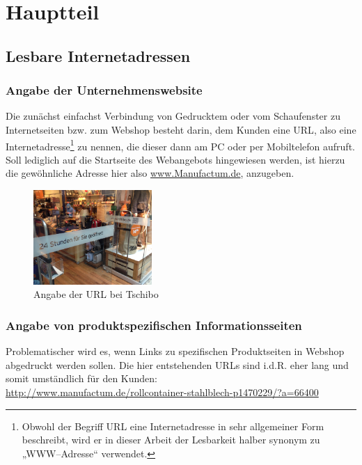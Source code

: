 \section{Hauptteil}
\label{sec:hauptteil}

\subsection{Lesbare Internetadressen}

\subsubsection{Angabe der Unternehmenswebsite}

Die zunächst einfachst Verbindung von Gedrucktem oder vom Schaufenster zu Internetseiten bzw. zum Webshop besteht darin, dem Kunden eine \ac{URL}, also eine Internetadresse\footnote{Obwohl der Begriff URL eine Internetadresse in sehr allgemeiner Form beschreibt, wird er in dieser Arbeit der Lesbarkeit halber synonym zu „WWW--Adresse“ verwendet.} zu nennen, die dieser dann am PC oder per Mobiltelefon aufruft.
Soll lediglich auf die Startseite des Webangebots hingewiesen werden, ist hierzu die gewöhnliche Adresse hier also \url{www.Manufactum.de}, anzugeben. 

\begin{figure}[H]
\begin{center}
\includegraphics[width=0.4\textwidth]{Tschibo-24-7.jpg}
\caption{Angabe der URL bei Tschibo}
\label{pic:tschibourl}
\end{center}
\end{figure}

\subsubsection{Angabe von produktspezifischen Informationsseiten}

Problematischer wird es, wenn Links zu spezifischen Produktseiten in Webshop abgedruckt werden sollen. Die hier entstehenden \ac{URL}s sind i.d.R. eher lang und somit umständlich für den Kunden:\\ \url{http://www.manufactum.de/rollcontainer-stahlblech-p1470229/?a=66400}

